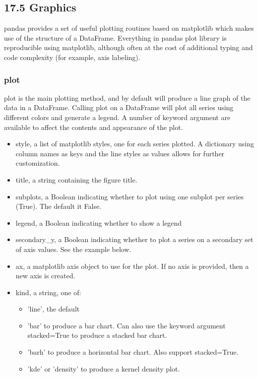 \documentclass[KSmain.tex]{subfiles}
\begin{document}

\subsection{17.5 Graphics}
pandas provides a set of useful plotting routines based on matplotlib which makes use of the structure
of a DataFrame. Everything in pandas plot library is reproducible using matplotlib, although often at the
cost of additional typing and code complexity (for example, axis labeling).

\subsubsection*{plot}
plot is the main plotting method, and by default will produce a line graph of the data in a DataFrame.
Calling plot on a DataFrame will plot all series using different colors and generate a legend. A number of
keyword argument are available to affect the contents and appearance of the plot.
\begin{itemize}
\item style, a list of matplotlib styles, one for each series plotted. A dictionary using column names as
keys and the line styles as values allows for further customization.
\item title, a string containing the figure title.
\item subplots, a Boolean indicating whether to plot using one subplot per series (True). The default it
False.
\item legend, a Boolean indicating whether to show a legend
\item secondary\_y, a Boolean indicating whether to plot a series on a secondary set of axis values. See the
example below.
\item ax, a matplotlib axis object to use for the plot. If no axis is provided, then a new axis is created.
\item kind, a string, one of:
\begin{itemize}
\item ’line’, the default
\item ’bar’ to produce a bar chart. Can also use the keyword argument stacked=True to produce a
stacked bar chart.
\item ’barh’ to produce a horizontal bar chart. Also support stacked=True.
\item’kde’ or ’density’ to produce a kernel density plot.
\end{itemize}
\end{itemize}
\end{document}
